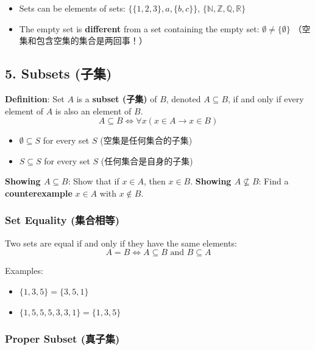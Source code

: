 \documentclass[10pt,a4paper,openany]{ctexbook}
\theoremstyle{definition}
\theoremstyle{remark}
\begin{document}
\begin{itemize}
\item Sets can be elements of sets: $\{\{1,2,3\}, a, \{b,c\}\}$, $\{\mathbb{N}, \mathbb{Z}, \mathbb{Q}, \mathbb{R}\}$
\item The empty set is \textbf{different} from a set containing the empty set: $\emptyset \neq \{\emptyset\}$ （空集和包含空集的集合是两回事！）

\end{itemize}

\vspace{-2pt}

\subsection{5. Subsets (子集)}

\textbf{Definition}: Set $A$ is a \textbf{subset (子集)} of $B$, denoted $A \subseteq B$, if and only if every element of $A$ is also an element of $B$.
\[
A \subseteq B \iff \forall x (x \in A \to x \in B)
\]

\begin{itemize}
\item $\emptyset \subseteq S$ for every set $S$ (空集是任何集合的子集)
\item $S \subseteq S$ for every set $S$ (任何集合是自身的子集)

\end{itemize}

\textbf{Showing $A \subseteq B$}: Show that if $x \in A$, then $x \in B$.
\textbf{Showing $A \not\subseteq B$}: Find a \textbf{counterexample} $x \in A$ with $x \notin B$.
\subsubsection{Set Equality (集合相等)}

Two sets are equal if and only if they have the same elements:
\[
A = B \iff A \subseteq B \text{ and } B \subseteq A
\]

Examples:
\begin{itemize}
\item $\{1,3,5\} = \{3,5,1\}$
\item $\{1,5,5,5,3,3,1\} = \{1,3,5\}$

\end{itemize}

\subsubsection{Proper Subset (真子集)}
\end{document}
